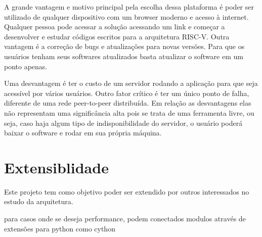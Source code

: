 		A grande vantagem e motivo principal pela escolha dessa plataforma é poder ser utilizado de qualquer dispositivo com um browser moderno e acesso à internet. Qualquer pessoa pode acessar a solução acessando um link e começar a desenvolver e estudar códigos escritos para a arquitetura RISC-V. 
		Outra vantagem é a correção de bugs e atualizações para novas versões. Para que os usuários tenham seus softwares atualizados basta atualizar o software em um ponto apenas.

		Uma desvantagem é ter o custo de um servidor rodando a aplicação para que seja acessível por vários usuários. Outro fator crítico é ter um único ponto de falha, diferente de uma rede peer-to-peer distribuída.
		Em relação as desvantagens elas não representam uma significância alta pois se trata de uma ferramenta livre, ou seja, caso haja algum tipo de indisponibilidade do servidor, o usuário poderá baixar o software e rodar em sua própria máquina. 



\section{Extensiblidade}

	Este projeto tem como objetivo poder ser extendido por outros interessados no estudo da arquitetura.

	para casos onde se deseja performance, podem conectados modulos através de extensões para python como cython~\cite{cython_home}
